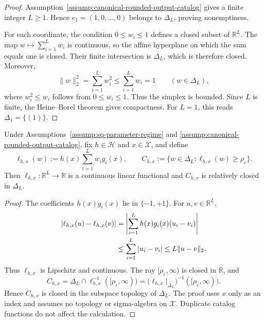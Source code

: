 \begin{proof}
Assumption~\ref{assump:canonical-rounded-output-catalog} gives a finite
integer \(L\ge1\).  Hence \(e_1=(1,0,\ldots,0)\) belongs to \(\Delta_L\),
proving nonemptiness.

For each coordinate, the condition \(0\le w_i\le1\) defines a closed subset
of \(\mathbb R^L\).  The map \(w\mapsto\sum_{i=1}^Lw_i\) is continuous, so
the affine hyperplane on which the sum equals one is closed.  Their finite
intersection is \(\Delta_L\), which is therefore closed.  Moreover,
\begin{equation}
\lVert w\rVert_2^2
=\sum_{i=1}^Lw_i^2
\le\sum_{i=1}^Lw_i
=1
\qquad (w\in\Delta_L),
\label{eq:step-004-simplex-bound}
\end{equation}
where \(w_i^2\le w_i\) follows from \(0\le w_i\le1\).  Thus the simplex is
bounded.  Since \(L\) is finite, the Heine--Borel theorem gives compactness.
For \(L=1\), this reads \(\Delta_1=\{(1)\}\).
\end{proof}

\begin{lemma}
\label{lem:step-004-constraint-closed}
Under Assumptions~\ref{assump:sq-parameter-regime} and
\ref{assump:canonical-rounded-output-catalog}, fix \(h\in\mathcal H\) and
\(x\in\mathcal X\), and define
\begin{equation}
\ell_{h,x}(w):=h(x)\sum_{i=1}^Lw_i g_i(x),
\qquad
C_{h,x}:=\{w\in\Delta_L:\ell_{h,x}(w)\ge\rho_{\varepsilon}\}.
\label{eq:step-004-point-constraint}
\end{equation}
Then \(\ell_{h,x}:\mathbb R^L\to\mathbb R\) is a continuous linear
functional and \(C_{h,x}\) is relatively closed in \(\Delta_L\).
\end{lemma}

\begin{proof}
The coefficients \(h(x)g_i(x)\) lie in \(\{-1,+1\}\).  For
\(u,v\in\mathbb R^L\),
\begin{align}
|\ell_{h,x}(u)-\ell_{h,x}(v)|
&=\left|\sum_{i=1}^Lh(x)g_i(x)(u_i-v_i)\right| \notag\\
&\le\sum_{i=1}^L|u_i-v_i|
\le L\lVert u-v\rVert_2.
\label{eq:step-004-functional-lipschitz}
\end{align}
Thus \(\ell_{h,x}\) is Lipschitz and continuous.  The ray
\([\rho_{\varepsilon},\infty)\) is closed in \(\mathbb R\), and
\begin{equation}
C_{h,x}
=\Delta_L\cap\ell_{h,x}^{-1}([\rho_{\varepsilon},\infty))
=\bigl(\ell_{h,x}|_{\Delta_L}\bigr)^{-1}
([\rho_{\varepsilon},\infty)).
\label{eq:step-004-closed-inverse-image}
\end{equation}
Hence \(C_{h,x}\) is closed in the subspace topology of \(\Delta_L\).  The
proof uses \(x\) only as an index and assumes no topology or sigma-algebra on
\(\mathcal X\).  Duplicate catalog functions do not affect the calculation.
\end{proof}

